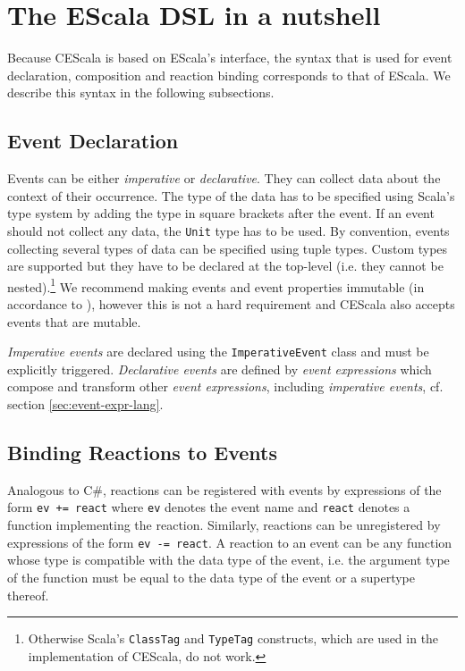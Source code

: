 \documentclass[book,type=bsc,colorback,accentcolor=tud8b,12pt,twoside]{tudthesis}
\begin{document}
\section{The EScala DSL in a nutshell}
\label{sec:escala-dsl}

Because CEScala is based on EScala's interface, the syntax that is used for event declaration, composition and reaction binding corresponds to that of EScala.  We describe this syntax in the following subsections.  

\subsection{Event Declaration}
\label{sec:event-declaration}

Events can be either \emph{imperative} or \emph{declarative}.  They can collect data about the context of their occurrence.  The type of the data has to be specified using Scala's type system by adding the type in square brackets after the event.  If an event should not collect any data, the \mbox{\texttt{Unit}} type has to be used.  By convention, events collecting several types of data can be specified using tuple types.  Custom types are supported but they have to be declared at the top-level (i.e. they cannot be nested).\footnote{Otherwise Scala's \mbox{\texttt{ClassTag}} and \mbox{\texttt{TypeTag}} constructs, which are used in the implementation of CEScala, do not work.}  We recommend making events and event properties immutable (in accordance to \cite{Esper}), however this is not a hard requirement and CEScala also accepts events that are mutable.  

\emph{Imperative events} are declared using the \mbox{\texttt{ImperativeEvent}} class and must be explicitly triggered.  \emph{Declarative events} are defined by \emph{event expressions} which compose and transform other \emph{event expressions}, including \emph{imperative events}, cf. section \ref{sec:event-expr-lang}.  

\subsection{Binding Reactions to Events}
\label{sec:bind-react-events}

Analogous to C\#, reactions can be registered with events by expressions of the form \mbox{\texttt{ev += react}} where \mbox{\texttt{ev}} denotes the event name and \mbox{\texttt{react}} denotes a function implementing the reaction.  Similarly, reactions can be unregistered by expressions of the form \mbox{\texttt{ev -= react}}.  A reaction to an event can be any function whose type is compatible with the data type of the event, i.e. the argument type of the function must be equal to the data type of the event or a supertype thereof.
\end{document}
